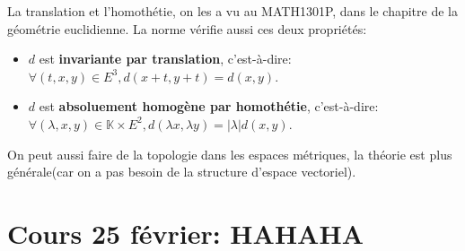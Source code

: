 \documentclass{article}
\begin{document}
\begin{tcolorbox}[colback=green!5!white,colframe=green!75!black,title=Propriété 1.1]

La translation et l'homothétie, on les a vu au MATH1301P, dans le chapitre de la géométrie euclidienne. La norme vérifie aussi ces deux propriétés:

\begin{itemize}
 \item $d$ est \textbf{invariante par translation}, c'est-à-dire: $\forall(t,x,y)\in E^{3}, d(x+t, y+t) = d(x,y)$.
 \item $d$ est \textbf{absoluement homogène par homothétie}, c'est-à-dire: $\forall(\lambda, x, y) \in \mathbb{K} \times E^{2}, d(\lambda x, \lambda y) = |\lambda|d(x,y)$.
\end{itemize}

\end{tcolorbox}

\begin{tcolorbox}[colback=yellow!5!white,colframe=yellow!75!black,title=Remarque 1.3]

On peut aussi faire de la topologie dans les espaces métriques, la théorie est plus générale(car on a pas besoin de la structure d'espace vectoriel).

\end{tcolorbox}





\section{Cours 25 février: HAHAHA}
\end{document}
